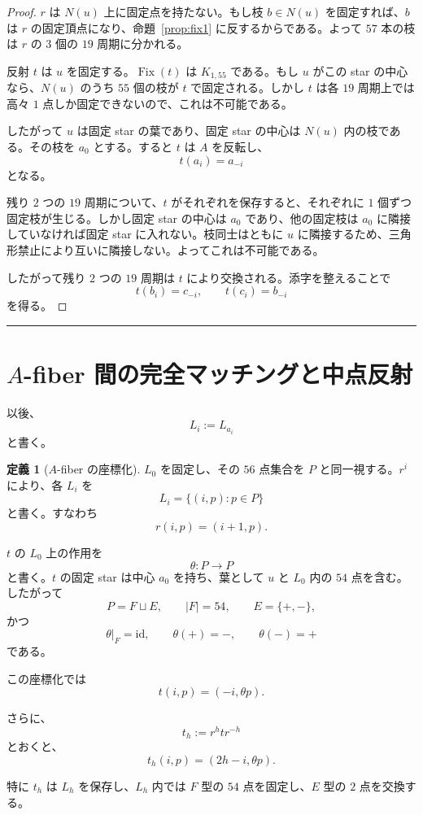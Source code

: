 \documentclass[11pt,a4paper]{article}
\theoremstyle{plain}
\theoremstyle{definition}
\newtheorem{definition}[theorem]{定義}
\theoremstyle{remark}
\DeclareMathOperator{\Fix}{Fix}
\begin{document}
\begin{proof}
$r$ は $N(u)$ 上に固定点を持たない。もし枝 $b \in N(u)$ を固定すれば、$b$ は $r$ の固定頂点になり、命題~\ref{prop:fix1} に反するからである。よって $57$ 本の枝は $r$ の $3$ 個の $19$ 周期に分かれる。

反射 $t$ は $u$ を固定する。$\Fix(t)$ は $K_{1,55}$ である。もし $u$ がこの star の中心なら、$N(u)$ のうち $55$ 個の枝が $t$ で固定される。しかし $t$ は各 $19$ 周期上では高々 $1$ 点しか固定できないので、これは不可能である。

したがって $u$ は固定 star の葉であり、固定 star の中心は $N(u)$ 内の枝である。その枝を $a_0$ とする。すると $t$ は $A$ を反転し、
\[
t(a_i) = a_{-i}
\]
となる。

残り $2$ つの $19$ 周期について、$t$ がそれぞれを保存すると、それぞれに $1$ 個ずつ固定枝が生じる。しかし固定 star の中心は $a_0$ であり、他の固定枝は $a_0$ に隣接していなければ固定 star に入れない。枝同士はともに $u$ に隣接するため、三角形禁止により互いに隣接しない。よってこれは不可能である。

したがって残り $2$ つの $19$ 周期は $t$ により交換される。添字を整えることで
\[
t(b_i) = c_{-i}, \qquad t(c_i) = b_{-i}
\]
を得る。
\end{proof}

\bigskip
\hrule
\bigskip

\section{$A$-fiber 間の完全マッチングと中点反射}

以後、
\[
L_i := L_{a_i}
\]
と書く。

\begin{definition}[$A$-fiber の座標化]\label{def:coords}
$L_0$ を固定し、その $56$ 点集合を $P$ と同一視する。$r^i$ により、各 $L_i$ を
\[
L_i = \{(i,p) : p \in P\}
\]
と書く。すなわち
\[
r(i,p) = (i+1, p).
\]

$t$ の $L_0$ 上の作用を
\[
\theta : P \to P
\]
と書く。$t$ の固定 star は中心 $a_0$ を持ち、葉として $u$ と $L_0$ 内の $54$ 点を含む。したがって
\[
P = F \sqcup E, \qquad |F| = 54, \qquad E = \{+,-\},
\]
かつ
\[
\theta|_F = \mathrm{id}, \qquad \theta(+) = -, \qquad \theta(-) = +
\]
である。

この座標化では
\[
t(i,p) = (-i, \theta p).
\]

さらに、
\[
t_h := r^h t r^{-h}
\]
とおくと、
\[
t_h(i,p) = (2h - i, \theta p).
\]

特に $t_h$ は $L_h$ を保存し、$L_h$ 内では $F$ 型の $54$ 点を固定し、$E$ 型の $2$ 点を交換する。
\end{definition}
\end{document}
